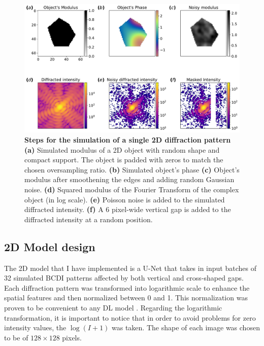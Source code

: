 \begin{figure}[h]
    \includegraphics[width=\textwidth]{figures/Inpainting/2D_dataset_creation.pdf}
    \caption{\textbf{Steps for the simulation of a single 2D diffraction pattern} 
    \textbf{(a)} Simulated modulus of a 2D object with random shape and compact support. The object is padded with 
    zeros to match the chosen oversampling ratio. \textbf{(b)} Simulated object's phase
    \textbf{(c)} Object's modulus after smoothening the edges and adding random Gaussian noise. \textbf{(d)} Squared modulus of the Fourier Transform
    of the complex object (in log scale).
    \textbf{(e)} Poisson noise is added to the simulated diffracted intensity. \textbf{(f)} A 6 pixel-wide
    vertical gap is added to the diffracted intensity at a random position.}
    \label{fig:2D_dataset_creation}
\end{figure}


\subsection{2D Model design}

The 2D model that I have implemented is a U-Net that takes in input batches of 32 simulated BCDI patterns affected 
by both vertical and cross-shaped gaps. Each diffraction pattern was transformed into logarithmic scale to enhance the 
spatial features and then normalized between 0 and 1. This normalization was proven to be convenient to any DL model \cite{efficientBackProp}.
Regarding the logarithmic transformation, it is important to notice that in order to avoid problems for zero intensity
values, the $\log(I+1)$ was taken. The shape of each image was chosen to be of $128\times128$ pixels. 

